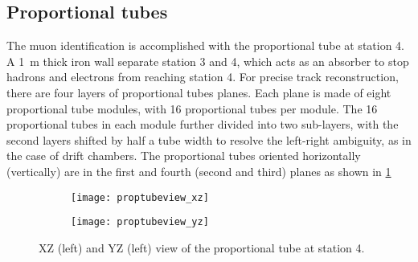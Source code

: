 \documentclass[../main.tex]{subfiles}
\begin{document}
\subsection{Proportional tubes}
The muon identification is accomplished with the proportional tube at station 4. A \SI{1}{\meter} thick
iron wall separate station 3 and 4, which acts as an absorber to stop hadrons and electrons from reaching
station 4. For precise track reconstruction, there are four layers of proportional tubes planes. Each plane
is made of eight proportional tube modules, with 16 proportional tubes per module. The 16 proportional tubes
in each module further divided into two sub-layers, with the second layers shifted by half a tube width to
resolve the left-right ambiguity, as in the case of drift chambers. The proportional tubes oriented horizontally
(vertically) are in the first and fourth (second and third) planes as shown in \cref{fig:prop}


\begin{figure}[ht!]
	\centering
	\begin{subfigure}{0.45\linewidth}
		\texttt{[image: proptubeview\_xz]}
	\end{subfigure}
	\begin{subfigure}{0.45\linewidth}
		\texttt{[image: proptubeview\_yz]}
	\end{subfigure}
	\caption{XZ (left) and YZ (left) view of the proportional tube at station 4.}
	\label{fig:prop}
\end{figure}
\end{document}
